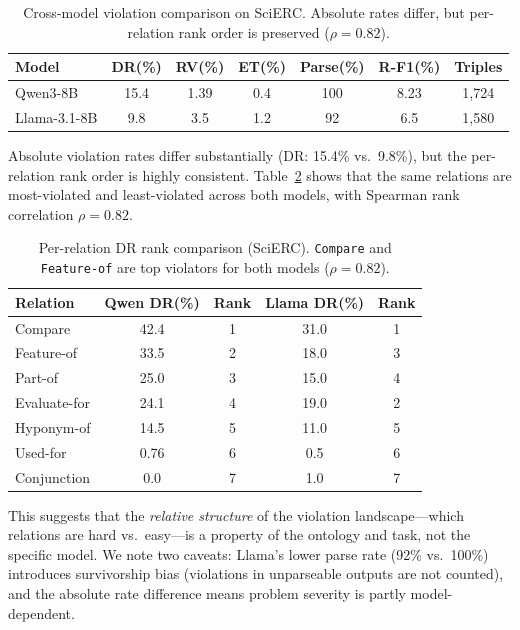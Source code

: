 \documentclass[11pt,a4paper]{article}
\begin{document}
\begin{table}[t]
\centering
\caption{Cross-model violation comparison on SciERC. Absolute rates differ, but per-relation rank order is preserved ($\rho{=}0.82$).}
\label{tab:crossmodel}
\begin{tabular}{lcccccc}
\toprule
\textbf{Model} & \textbf{DR(\%)} & \textbf{RV(\%)} & \textbf{ET(\%)} & \textbf{Parse(\%)} & \textbf{R-F1(\%)} & \textbf{Triples} \\
\midrule
Qwen3-8B      & 15.4 & 1.39 & 0.4 & 100 & 8.23 & 1,724 \\
Llama-3.1-8B  &  9.8 & 3.5  & 1.2 &  92 & 6.5  & 1,580 \\
\bottomrule
\end{tabular}
\end{table}

Absolute violation rates differ substantially (DR: 15.4\% vs.\ 9.8\%), but the per-relation rank order is highly consistent.
Table~\ref{tab:perrel_rank} shows that the same relations are most-violated and least-violated across both models, with Spearman rank correlation $\rho{=}0.82$.

\begin{table}[t]
\centering
\caption{Per-relation DR rank comparison (SciERC). \texttt{Compare} and \texttt{Feature-of} are top violators for both models ($\rho{=}0.82$).}
\label{tab:perrel_rank}
\small
\begin{tabular}{lcccc}
\toprule
\textbf{Relation} & \textbf{Qwen DR(\%)} & \textbf{Rank} & \textbf{Llama DR(\%)} & \textbf{Rank} \\
\midrule
Compare      & 42.4 & 1 & 31.0 & 1 \\
Feature-of   & 33.5 & 2 & 18.0 & 3 \\
Part-of      & 25.0 & 3 & 15.0 & 4 \\
Evaluate-for & 24.1 & 4 & 19.0 & 2 \\
Hyponym-of   & 14.5 & 5 & 11.0 & 5 \\
Used-for     &  0.76& 6 &  0.5 & 6 \\
Conjunction  &  0.0 & 7 &  1.0 & 7 \\
\bottomrule
\end{tabular}
\end{table}

This suggests that the \emph{relative structure} of the violation landscape---which relations are hard vs.\ easy---is a property of the ontology and task, not the specific model.
We note two caveats: Llama's lower parse rate (92\% vs.\ 100\%) introduces survivorship bias (violations in unparseable outputs are not counted), and the absolute rate difference means problem severity is partly model-dependent.
\end{document}
